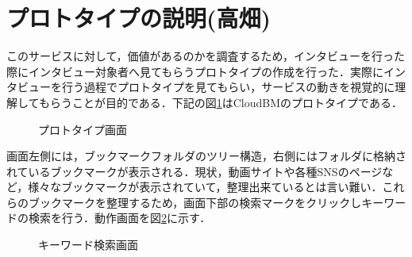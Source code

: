 \documentclass[a4paper,10pt,fleqn]{jsarticle}
\begin{document}
\section{プロトタイプの説明(高畑)}
このサービスに対して，価値があるのかを調査するため，インタビューを行った際にインタビュー対象者へ見てもらうプロトタイプの作成を行った．実際にインタビューを行う過程でプロトタイプを見てもらい，サービスの動きを視覚的に理解してもらうことが目的である．下記の図\ref{fig:prot1}はCloudBMのプロトタイプである．

\begin{figure}[h]
  \begin{center}
    \caption{プロトタイプ画面}
    \label{fig:prot1}
  \end{center}
\end{figure}

画面左側には，ブックマークフォルダのツリー構造，右側にはフォルダに格納されているブックマークが表示される．現状，動画サイトや各種SNSのページなど，様々なブックマークが表示されていて，整理出来ているとは言い難い．これらのブックマークを整理するため，画面下部の検索マークをクリックしキーワードの検索を行う．動作画面を図\ref{fig:prot2}に示す．

\begin{figure}[h]
  \begin{center}
    \caption{キーワード検索画面}
    \label{fig:prot2}
  \end{center}
\end{figure}
\end{document}
